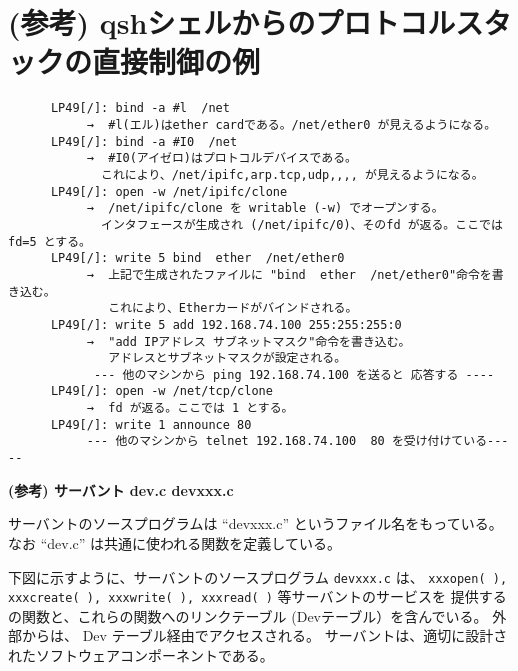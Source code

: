 \section{(参考) qshシェルからのプロトコルスタックの直接制御の例}

\begin{verbatim}
      LP49[/]: bind -a #l  /net  
           →  #l(エル)はether cardである。/net/ether0 が見えるようになる。
      LP49[/]: bind -a #I0  /net           
           →  #I0(アイゼロ)はプロトコルデバイスである。
             これにより、/net/ipifc,arp.tcp,udp,,,, が見えるようになる。
      LP49[/]: open -w /net/ipifc/clone    
           →  /net/ipifc/clone を writable (-w) でオープンする。
             インタフェースが生成され (/net/ipifc/0)、そのfd が返る。ここでは fd=5 とする。
      LP49[/]: write 5 bind  ether  /net/ether0  
           →  上記で生成されたファイルに "bind  ether  /net/ether0"命令を書き込む。
              これにより、Etherカードがバインドされる。
      LP49[/]: write 5 add 192.168.74.100 255:255:255:0  
           →  "add IPアドレス サブネットマスク"命令を書き込む。
              アドレスとサブネットマスクが設定される。
            --- 他のマシンから ping 192.168.74.100 を送ると 応答する ----
      LP49[/]: open -w /net/tcp/clone      
           →  fd が返る。ここでは 1 とする。
      LP49[/]: write 1 announce 80
           --- 他のマシンから telnet 192.168.74.100  80 を受け付けている-----
\end{verbatim}


{\bf\flushleft (参考) サーバント dev.c   devxxx.c}

      サーバントのソースプログラムは ``devxxx.c'' というファイル名をもっている。
      なお ``dev.c'' は共通に使われる関数を定義している。

      下図に示すように、サーバントのソースプログラム {\tt devxxx.c} は、
      {\tt xxxopen( ), xxxcreate( ), xxxwrite( ), xxxread( )} 等サーバントのサービスを
      提供するの関数と、これらの関数へのリンクテーブル (Devテーブル）を含んでいる。
      外部からは、 Dev テーブル経由でアクセスされる。
      サーバントは、適切に設計されたソフトウェアコンポーネントである。

